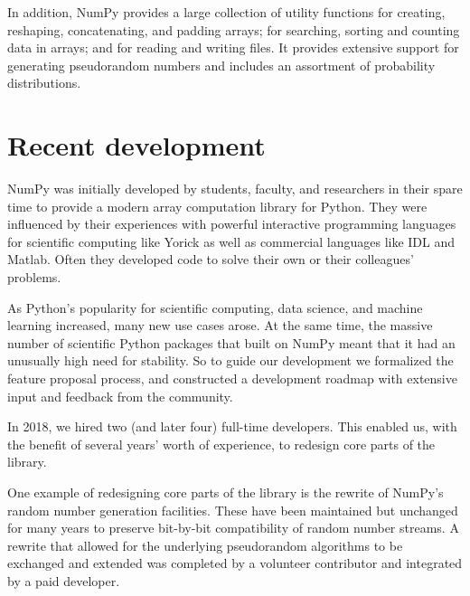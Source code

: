 In addition, NumPy provides a large collection of utility functions for creating, reshaping, concatenating, and padding arrays; for searching, sorting and counting data in arrays; and for reading and writing files.  It provides extensive support for generating pseudorandom numbers and includes an assortment of probability distributions.


\section*{Recent development}


NumPy was initially developed by students, faculty, and researchers in their
spare time to provide a modern array computation library for Python.
They were influenced by their experiences with powerful interactive programming
languages for scientific computing like Yorick \cite{munro1995using} as well
as commercial languages like IDL and Matlab.
Often they developed code to solve their own or their colleagues' problems.

As Python's popularity for scientific computing, data science, and machine
learning increased, many new use cases arose.
At the same time, the massive number of scientific Python packages that
built on NumPy meant that it had an unusually high need for stability.
So to guide our development we formalized the feature proposal process, and
constructed a development roadmap with extensive input and feedback from the
community.

In 2018, we hired two (and later four) full-time developers.
This enabled us, with the benefit of several years' worth of experience,
to redesign core parts of the library.

One example of redesigning core parts of the library is the rewrite of NumPy's
random number generation facilities.
These have been maintained but unchanged for many years to preserve bit-by-bit
compatibility of random number streams.  A rewrite that allowed for the
underlying pseudorandom algorithms to be exchanged and extended was completed
by a volunteer contributor and integrated by a paid developer.


